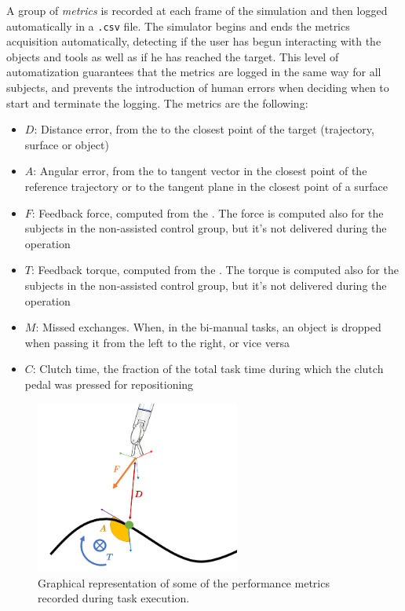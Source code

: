\documentclass[../main.tex]{subfiles}
\begin{document}
A group of \textit{metrics} is recorded at each frame of the simulation and then logged automatically in a \texttt{.csv} file. The simulator begins and ends the metrics acquisition automatically, detecting if the user has begun interacting with the objects and tools as well as if he has reached the target. This level of automatization guarantees that the metrics are logged in the same way for all subjects, and prevents the introduction of human errors when deciding when to start and terminate the logging. The metrics are the following:
\begin{itemize}
    \item $D$: Distance error, from the \ee to the closest point of the target (trajectory, surface or object)
    \item $A$: Angular error, from the \ee to tangent vector in the closest point of the reference trajectory or to the tangent plane in the closest point of a surface
    \item $F$: Feedback force, computed from the \vf. The force is computed also for the subjects in the non-assisted control group, but it's not delivered during the operation
    \item $T$: Feedback torque, computed from the \vf. The torque is computed also for the subjects in the non-assisted control group, but it's not delivered during the operation
    \item $M$: Missed exchanges. When, in the bi-manual tasks, an object is dropped when passing it from the left \psm to the right, or vice versa
    \item $C$: Clutch time, the fraction of the total task time during which the clutch pedal was pressed for repositioning
\end{itemize}  

\begin{figure}
    \centering
    \includegraphics[width=0.6\textwidth]{images/metrics.png}
    \caption{Graphical representation of some of the performance metrics recorded during task execution. }
    \label{fig:metrics}
\end{figure}
\end{document}
